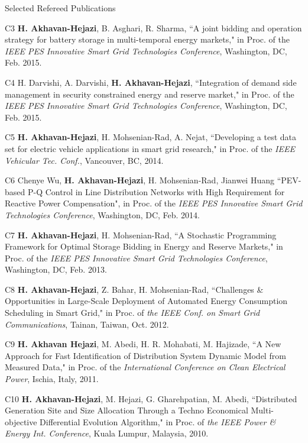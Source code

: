 \documentclass{resume} %
\begin{document}
\begin{rSection}{ Selected Refereed Publications}
\item [C3] {\bf H. Akhavan-Hejazi}, B. Asghari, R. Sharma, ``A joint bidding and operation strategy for battery storage in multi-temporal energy markets," in Proc. of the \emph{IEEE PES Innovative Smart Grid Technologies Conference}, Washington, DC, Feb. 2015. 

\item [C4] H. Darvishi, A. Darvishi, {\bf H. Akhavan-Hejazi}, ``Integration of demand side management in security constrained energy and reserve market," in Proc. of the \emph{IEEE PES Innovative Smart Grid Technologies Conference}, Washington, DC, Feb. 2015.

\item [C5] {\bf	H. Akhavan-Hejazi}, H. Mohsenian-Rad, A. Nejat, ``Developing a test data set for electric vehicle applications in smart grid research," in Proc. of the \emph{IEEE Vehicular Tec. Conf.}, Vancouver, BC, 2014. 

\item  [C6]	Chenye Wu, { \bf H. Akhavan-Hejazi}, H. Mohsenian-Rad, Jianwei Huang ``PEV-based P-Q Control in Line Distribution Networks with High Requirement for Reactive Power Compensation", in Proc. of the \emph{IEEE PES Innovative Smart Grid Technologies Conference}, Washington, DC, Feb. 2014. 

\item [C7]	{\bf H. Akhavan-Hejazi}, H. Mohsenian-Rad, ``A Stochastic Programming Framework for Optimal Storage Bidding in Energy and Reserve Markets," in Proc. of the \emph{IEEE PES Innovative Smart Grid Technologies Conference}, Washington, DC, Feb. 2013.

\item [C8] {\bf	H. Akhavan-Hejazi}, Z. Bahar, H. Mohsenian-Rad, ``Challenges \& Opportunities in Large-Scale Deployment of Automated Energy Consumption Scheduling in Smart Grid," in Proc. of \emph{the IEEE Conf. on Smart Grid Communications}, Tainan, Taiwan, Oct. 2012. 

\item [C9] {\bf	H. Akhavan Hejazi}, M. Abedi, H. R. Mohabati, M. Hajizade, ``A New Approach for Fast Identification of Distribution System Dynamic Model from Measured Data," in Proc. of the \emph{International Conference on Clean Electrical Power}, Ischia, Italy, 2011. 

\item [C10] {\bf H. Akhavan-Hejazi}, M. Hejazi, G. Gharehpatian, M. Abedi, ``Distributed Generation Site and Size Allocation Through a Techno Economical Multi-objective Differential Evolution Algorithm," in Proc. of \emph{the IEEE Power \& Energy Int. Conference}, Kuala Lumpur, Malaysia, 2010.




\end{rSection}
\end{document}
